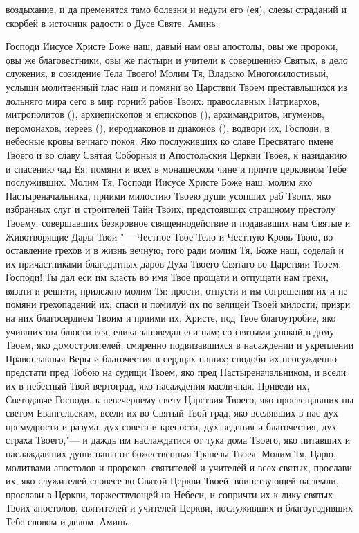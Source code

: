 \begin{mymulticols}
воздыхание, и да пременятся тамо болезни и недуги его (ея), слезы страданий и скорбей в источник радости о Дусе Святе. Аминь. 

\end{mymulticols}

\mychapterending


\begin{mymulticols}
 


Господи Иисусе Христе Боже наш, давый нам овы апостолы, овы же пророки, овы же благовестники, овы же пастыри и учители к совершению Святых, в дело служения, в созидение Тела Твоего! Молим Тя, Владыко Многомилостивый, услыши молитвенный глас наш и помяни во Царствии Твоем преставльшихся из дольняго мира сего в мир горний рабов Твоих: православных Патриархов, митрополитов (), архиепископов и епископов (), архимандритов, игуменов, иеромонахов, иереев (), иеродиаконов и диаконов (); водвори их, Господи, в небесные кровы вечнаго покоя. Яко послуживших ко славе Пресвятаго имене Твоего и во славу Святая Соборныя и Апостольския Церкви Твоея, к назиданию и спасению чад Ея; помяни и всех в монашеском чине и причте церковном Тебе послуживших. Молим Тя, Господи Иисусе Христе Боже наш, молим яко Пастыреначальника, приими милостию Твоею души усопших раб Твоих, яко избранных слуг и строителей Тайн Твоих, предстоявших страшному престолу Твоему, совершавших безкровное священнодействие и подававших нам Святые и Животворящие Дары Твои "--- Честное Твое Тело и Честную Кровь Твою, во оставление грехов и в жизнь вечную; того ради молим Тя, Боже наш, соделай и их причастниками благодатных даров Духа Твоего Святаго во Царствии Твоем. Господи! Ты дал еси им власть во имя Твое прощати и отпущати нам грехи, вязати и решити, прилежно молим Тя: прости, отпусти и им согрешения их и не помяни грехопадений их; спаси и помилуй их по велицей Твоей милости; призри на них благосердием Твоим и приими их, Христе, под Твое благоутробие, яко учивших ны блюсти вся, елика заповедал еси нам; со святыми упокой в дому Твоем, яко домостроителей, смиренно подвизавшихся в насаждении и укреплении Православныя Веры и благочестия в сердцах наших; сподоби их неосужденно предстати пред Тобою на судищи Твоем, яко пред Пастыреначальником, и всели их в небесный Твой вертоград, яко насаждения масличная. Приведи их, Светодавче Господи, к невечернему свету Царствия Твоего, яко просвещавших ны светом Евангельским, всели их во Святый Твой град, яко вселявших в нас дух премудрости и разума, дух совета и крепости, дух ведения и благочестия, дух страха Твоего,"--- и даждь им наслаждатися от тука дома Твоего, яко питавших и наслаждавших души наша от божественныя Трапезы Твоея. Молим Тя, Царю, молитвами апостолов и пророков, святителей и учителей и всех святых, прослави их, яко служителей словесе во Святой Церкви Твоей, воинствующей на земли, прослави в Церкви, торжествующей на Небеси, и сопричти их к лику святых Твоих апостолов, святителей и учителей Церкви, послуживших и благоугодивших Тебе словом и делом. Аминь. 
\longpage[2]{}


\end{mymulticols}

